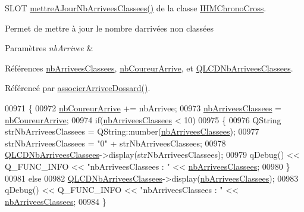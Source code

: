 S\+L\+OT \hyperlink{class_i_h_m_chrono_cross_a3d786cb4b5c5e3a4bd566f19409601d5}{mettre\+A\+Jour\+Nb\+Arrivees\+Classees()} de la classe \hyperlink{class_i_h_m_chrono_cross}{I\+H\+M\+Chrono\+Cross}. 

Permet de mettre à jour le nombre d\textquotesingle{}arrivées non classées 
\begin{DoxyParams}{Paramètres}
{\em nb\+Arrivee} & \\
\hline
\end{DoxyParams}


Références \hyperlink{class_i_h_m_chrono_cross_a9bdcd0e57b79f64957eefea0f9d2b097}{nb\+Arrivees\+Classees}, \hyperlink{class_i_h_m_chrono_cross_aba349505e99e6e320b218ba2b7fb485e}{nb\+Coureur\+Arrive}, et \hyperlink{class_i_h_m_chrono_cross_aeba189eacad7e19e009ae4764f98b9be}{Q\+L\+C\+D\+Nb\+Arrivees\+Classees}.



Référencé par \hyperlink{class_i_h_m_chrono_cross_a9f7f1ad130b60300a879694b6234f161}{associer\+Arrivee\+Dossard()}.


\begin{DoxyCode}
00971 \{
00972     \hyperlink{class_i_h_m_chrono_cross_aba349505e99e6e320b218ba2b7fb485e}{nbCoureurArrive} += nbArrivee;
00973     \hyperlink{class_i_h_m_chrono_cross_a9bdcd0e57b79f64957eefea0f9d2b097}{nbArriveesClassees} = \hyperlink{class_i_h_m_chrono_cross_aba349505e99e6e320b218ba2b7fb485e}{nbCoureurArrive};
00974     \textcolor{keywordflow}{if}(\hyperlink{class_i_h_m_chrono_cross_a9bdcd0e57b79f64957eefea0f9d2b097}{nbArriveesClassees} < 10)
00975     \{
00976         QString strNbArriveesClassees = QString::number(\hyperlink{class_i_h_m_chrono_cross_a9bdcd0e57b79f64957eefea0f9d2b097}{nbArriveesClassees});
00977         strNbArriveesClassees = \textcolor{stringliteral}{"0"} + strNbArriveesClassees;
00978         \hyperlink{class_i_h_m_chrono_cross_aeba189eacad7e19e009ae4764f98b9be}{QLCDNbArriveesClassees}->display(strNbArriveesClassees);
00979         qDebug() << Q\_FUNC\_INFO << \textcolor{stringliteral}{"nbArriveesClassees : "} << \hyperlink{class_i_h_m_chrono_cross_a9bdcd0e57b79f64957eefea0f9d2b097}{nbArriveesClassees};
00980     \}
00981     \textcolor{keywordflow}{else}
00982         \hyperlink{class_i_h_m_chrono_cross_aeba189eacad7e19e009ae4764f98b9be}{QLCDNbArriveesClassees}->display(\hyperlink{class_i_h_m_chrono_cross_a9bdcd0e57b79f64957eefea0f9d2b097}{nbArriveesClassees});
00983         qDebug() << Q\_FUNC\_INFO << \textcolor{stringliteral}{"nbArriveesClassees : "} << \hyperlink{class_i_h_m_chrono_cross_a9bdcd0e57b79f64957eefea0f9d2b097}{nbArriveesClassees};
00984 \}
\end{DoxyCode}
\mbox{\label{class_i_h_m_chrono_cross_a1b23fda62742f2dd17652d3abcb33dd6}} 
